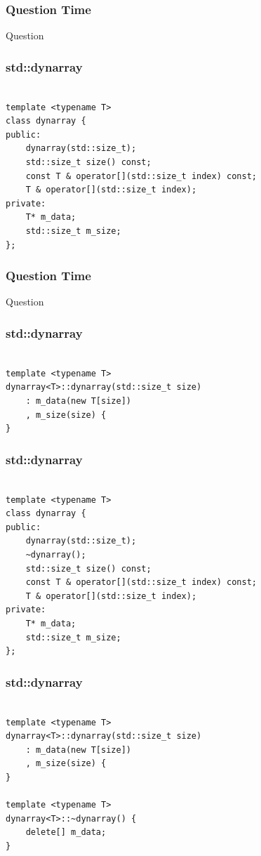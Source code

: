 \documentclass[xetex,mathserif]{beamer}
\newcounter{QC}
\begin{document}
\begin{frame}
\frametitle{Question Time}
\huge Question  
\end{frame}


\begin{frame}[containsverbatim]
\frametitle{std::dynarray}
\begin{lstlisting}

template <typename T>
class dynarray {
public:
	dynarray(std::size_t);	
	std::size_t size() const;
	const T & operator[](std::size_t index) const;
	T & operator[](std::size_t index);
private:
	T* m_data;
	std::size_t m_size;
};
\end{lstlisting}
\end{frame}

\begin{frame}
\frametitle{Question Time}
\huge Question  
\end{frame}

\begin{frame}[containsverbatim]
\frametitle{std::dynarray}
\begin{lstlisting}

template <typename T>
dynarray<T>::dynarray(std::size_t size)
	: m_data(new T[size])
	, m_size(size) {	
}

\end{lstlisting}
\end{frame}


\begin{frame}[containsverbatim]
\frametitle{std::dynarray}
\begin{lstlisting}

template <typename T>
class dynarray {
public:
	dynarray(std::size_t);
	~dynarray();
	std::size_t size() const;
	const T & operator[](std::size_t index) const;
	T & operator[](std::size_t index);
private:
	T* m_data;
	std::size_t m_size;
};
\end{lstlisting}
\end{frame}

\begin{frame}[containsverbatim]
\frametitle{std::dynarray}
\begin{lstlisting}

template <typename T>
dynarray<T>::dynarray(std::size_t size)
	: m_data(new T[size])
	, m_size(size) {	
}

template <typename T>
dynarray<T>::~dynarray() {
	delete[] m_data;	
}


\end{lstlisting}
\end{frame}
\end{document}
